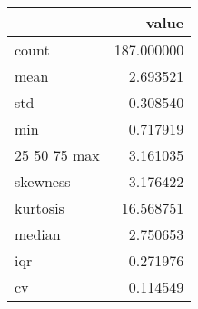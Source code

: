\begin{tabular}{lr}
\toprule
 & value \\
\midrule
count & 187.000000 \\
mean & 2.693521 \\
std & 0.308540 \\
min & 0.717919 \\
25%
50%
75%
max & 3.161035 \\
skewness & -3.176422 \\
kurtosis & 16.568751 \\
median & 2.750653 \\
iqr & 0.271976 \\
cv & 0.114549 \\
\bottomrule
\end{tabular}
